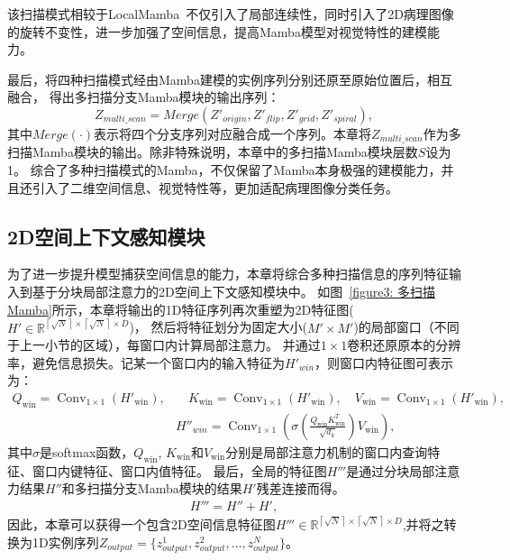 该扫描模式相较于LocalMamba~\cite{huang2024localmamba}不仅引入了局部连续性，同时引入了2D病理图像的旋转不变性，进一步加强了空间信息，提高Mamba模型对视觉特性的建模能力。

最后，将四种扫描模式经由Mamba建模的实例序列分别还原至原始位置后，相互融合，
得出多扫描分支Mamba模块的输出序列：
\begin{equation}
  Z_{multi\_scan}=Merge(Z'_{origin}, Z'_{flip}, Z'_{grid}, Z'_{spiral}),
\end{equation}
其中$Merge(\cdot)$表示将四个分支序列对应融合成一个序列。本章将$Z_{multi\_scan}$作为多扫描Mamba模块的输出。除非特殊说明，本章中的多扫描Mamba模块层数$S$设为1。
综合了多种扫描模式的Mamba，不仅保留了Mamba本身极强的建模能力，并且还引入了二维空间信息、视觉特性等，更加适配病理图像分类任务。

\subsection[\hspace{-2pt}2D空间上下文感知模块]{{\heiti{} \hspace{-8pt}2D空间上下文感知模块}}\label{section3: 2D空间上下文感知模块}

为了进一步提升模型捕获空间信息的能力，本章将综合多种扫描信息的序列特征输入到基于分块局部注意力的2D空间上下文感知模块中。
如图~\ref{figure3: 多扫描Mamba}所示，本章将输出的1D特征序列再次重塑为2D特征图($H'\in \mathbb{R} ^{\left\lceil\sqrt{N}\right\rceil\times\left\lceil\sqrt{N}\right\rceil\times D}$)，
然后将特征划分为固定大小($M' \times M'$)的局部窗口（不同于上一小节的区域），每窗口内计算局部注意力。
并通过$1 \times 1$卷积还原原本的分辨率，避免信息损失。记某一个窗口内的输入特征为$H'_{win}$，则窗口内特征图可表示为：
\begin{equation}
\begin{aligned}
  Q_{\mathrm{win}}=\operatorname{Conv}_{1 \times 1}\left(H'_{\mathrm{win}}\right),
  &\quad K_{\mathrm{win}}=\operatorname{Conv}_{1 \times 1}\left(H'_{\mathrm{win}}\right),
  \quad V_{\mathrm{win}}=\operatorname{Conv}_{1 \times 1}\left(H'_{\mathrm{win}}\right),\\
  &H''_{win}=\operatorname{Conv}_{1 \times 1}\left(\sigma\left(\frac{Q_{\mathrm{win}} K_{\mathrm{win}}^{T}}{\sqrt{d_{k}}}\right) V_{\mathrm{win}}\right) ,
\end{aligned}
\end{equation}
其中$\sigma$是softmax函数，$Q_{\mathrm{win}}$, $K_{\mathrm{win}}$和$V_{\mathrm{win}}$分别是局部注意力机制的窗口内查询特征、窗口内键特征、窗口内值特征。
最后，全局的特征图$H'''$是通过分块局部注意力结果$H''$和多扫描分支Mamba模块的结果$H'$残差连接而得。
\begin{equation}
  \begin{aligned}
    H'''= H''+ H',
  \end{aligned}
  \end{equation}
因此，本章可以获得一个包含2D空间信息特征图$H'''\in \mathbb{R} ^{\left\lceil\sqrt{N}\right\rceil\times\left\lceil\sqrt{N}\right\rceil\times D}$,并将之转换为1D实例序列$Z_{output}=\{z^1_{output},z^2_{output},...,z^N_{output}\}$。


